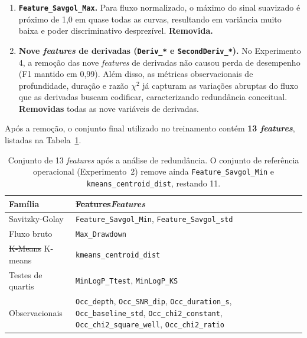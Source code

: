 \documentclass[msc]{on} %
\makeatletter
\providecommand{\DIFaddtex}[1]{{\protect\color{red}#1}} %
\providecommand{\DIFdeltex}[1]{{\protect\color{red}\sout{#1}}} %
\providecommand{\DIFaddbegin}{} %
\providecommand{\DIFaddend}{} %
\providecommand{\DIFdelbegin}{} %
\providecommand{\DIFdelend}{} %
\providecommand{\DIFaddFL}[1]{\DIFadd{#1}} %
\providecommand{\DIFdelFL}[1]{\DIFdel{#1}} %
\providecommand{\DIFaddbeginFL}{} %
\providecommand{\DIFaddendFL}{} %
\providecommand{\DIFdelbeginFL}{} %
\providecommand{\DIFdelendFL}{} %
\providecommand{\DIFadd}[1]{\texorpdfstring{\DIFaddtex{#1}}{#1}} %
\providecommand{\DIFdel}[1]{\texorpdfstring{\DIFdeltex{#1}}{}} %
\let\sout@orig\sout %
\renewcommand{\sout}[1]{\ifmmode\text{\sout@orig{\ensuremath{#1}}}\else\sout@orig{#1}\fi} %
\makeatother
\begin{document}
\begin{enumerate}
	\item \textbf{\texttt{Feature\_Savgol\_Max}.}
	Para fluxo normalizado, o máximo do sinal suavizado é próximo de 1,0 em quase todas as curvas, resultando em variância muito baixa e poder discriminativo desprezível. \textbf{Removida.}

	\item \textbf{Nove \textit{features} de derivadas (\texttt{Deriv\_*} e \texttt{SecondDeriv\_*}).}
	No Experimento 4, a remoção das nove \textit{features} de derivadas não causou perda de desempenho (F1 mantido em 0,99). Além disso, as métricas observacionais de profundidade, duração e razão $\chi^2$ já capturam as variações abruptas do fluxo que as derivadas buscam codificar, caracterizando redundância conceitual. \textbf{Removidas} todas as nove variáveis de derivadas.
\end{enumerate}

Após a remoção, o conjunto final utilizado no treinamento contém \textbf{13 \textit{features}}, listadas na Tabela~\ref{tab:features_final}.

\DIFdelbegin %
\DIFdelend \DIFaddbegin \begin{table}[htbp]
\centering
\caption{\DIFaddFL{Conjunto de 13 }\textit{\DIFaddFL{features}} \DIFaddFL{após a análise de redundância. O conjunto de referência operacional (Experimento~2) remove ainda }\texttt{\DIFaddFL{Feature\_Savgol\_Min}} \DIFaddFL{e }\texttt{\DIFaddFL{kmeans\_centroid\_dist}}\DIFaddFL{, restando 11.}}
\DIFaddendFL \label{tab:features_final}
\DIFaddbeginFL \begin{tabular}{lp{8.6cm}}
\hline
\DIFaddendFL \textbf{Família} & \textbf{\DIFdelbeginFL \DIFdelFL{Features}\DIFdelendFL \DIFaddbeginFL \textit{\DIFaddFL{Features}}\DIFaddendFL } \\
\hline
Savitzky-Golay & \texttt{Feature\_Savgol\_Min}, \texttt{Feature\_Savgol\_std} \\
Fluxo bruto & \texttt{Max\_Drawdown} \\
\DIFdelbeginFL \DIFdelFL{K-Means }\DIFdelendFL \DIFaddbeginFL \DIFaddFL{K-means }\DIFaddendFL & \texttt{kmeans\_centroid\_dist} \\
Testes de quartis & \texttt{MinLogP\_Ttest}, \texttt{MinLogP\_KS} \\
Observacionais & \texttt{Occ\_depth}, \texttt{Occ\_SNR\_dip}, \texttt{Occ\_duration\_s}, \texttt{Occ\_baseline\_std}, \texttt{Occ\_chi2\_constant}, \texttt{Occ\_chi2\_square\_well}, \texttt{Occ\_chi2\_ratio} \\
\hline
\end{tabular}
\DIFaddbeginFL \end{table}
\DIFaddend 
\end{document}
